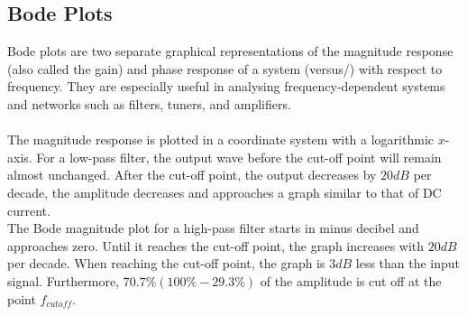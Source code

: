 \subsection{Bode Plots}
Bode plots are two separate graphical representations of the magnitude response (also called the gain) and phase response of a system (versus/) with respect to frequency. They are especially useful in analysing frequency-dependent systems and networks such as filters, tuners, and amplifiers. \cite [p. 626]{bcircuit5}  \\
\\
The magnitude response is plotted in a coordinate system with a logarithmic $x$-axis. For a low-pass filter, the output wave before the cut-off point will remain almost unchanged. After the cut-off point, the output decreases by $20 dB$ per decade, the amplitude decreases and approaches a graph similar to that of DC current. \\
The Bode magnitude plot for a high-pass filter starts in minus decibel and approaches zero. Until it reaches the cut-off point, the graph increases with $20 dB$ per decade. When reaching the cut-off point, the graph is $3 dB$ less than the input signal. Furthermore, $70.7\% (100\%-29.3\%)$ of the amplitude is cut off at the point $f_{cutoff}$.

